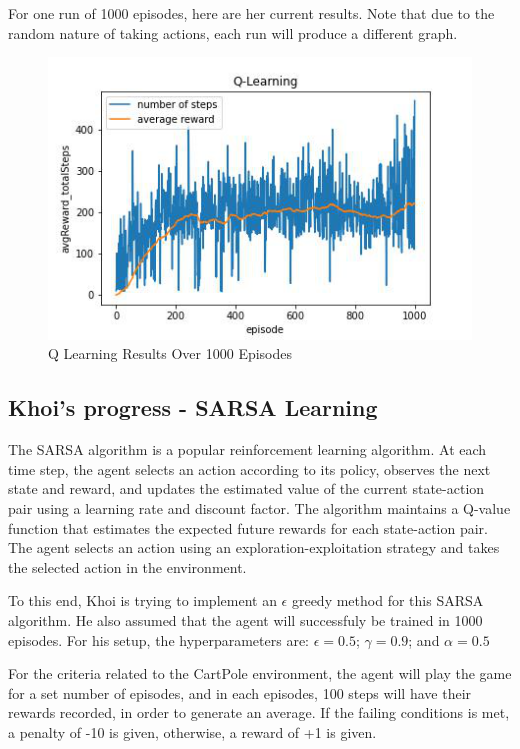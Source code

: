 \documentclass[nohyperref]{article}
\theoremstyle{plain}
\theoremstyle{definition}
\theoremstyle{remark}
\begin{document}
For one run of 1000 episodes, here are her current results. Note that due to the random nature of taking actions, each run will produce a different graph.
\begin{figure}[H] %
    \centering
    \includegraphics[width=1\linewidth]{q-learning-average-1k.png}
    \caption{Q Learning Results Over 1000 Episodes}
\end{figure}

\subsection*{Khoi's progress - SARSA Learning}
The SARSA algorithm is a popular reinforcement learning algorithm. At each time step, the agent selects an action according to its policy, observes the next state and reward, and updates the estimated value of the current state-action pair using a learning rate and discount factor. 
The algorithm maintains a Q-value function that estimates the expected future rewards for each state-action pair. The agent selects an action using an exploration-exploitation strategy and takes the selected action in the environment.

To this end, Khoi is trying to implement an $\epsilon$ greedy method for this SARSA algorithm. He also assumed that the agent will successfuly be trained in 1000 episodes. For his setup, the hyperparameters are: $\epsilon = 0.5$; $\gamma = 0.9$; and $\alpha = 0.5$

For the criteria related to the CartPole environment, the agent will play the game for a set number of episodes, and in each episodes, 100 steps will have their rewards recorded, in order to generate an average.
If the failing conditions is met, a penalty of -10 is given, otherwise, a reward of +1 is given.
\end{document}
